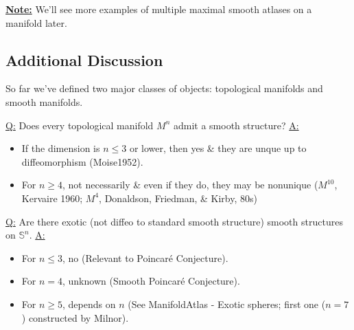 \documentclass{article}
\begin{document}
\vskip 0.5cm  
\underline{\textbf{Note:}} We'll see more examples of multiple maximal smooth atlases on a manifold later.

\vskip 1cm  
\subsection*{Additional Discussion}

\vskip 0.5cm  
So far we've defined two major classes of objects: topological manifolds and smooth manifolds.

\vskip 0.5cm  
\begin{dottedbox}
  \underline{Q:} Does every topological manifold $M^n$ admit a smooth structure?
  \vskip 0.5cm  
  \underline{A:} 
  \begin{itemize}
    \item If the dimension is $n \leq 3$ or lower, then yes \& they are unque up to diffeomorphism (Moise1952).
    \item For $n \geq 4$, not necessarily \& even if they do, they may be nonunique ($M^{10}$, Kervaire 1960; $M^4$, Donaldson, Friedman, \& Kirby, 80s)
  \end{itemize} 
\end{dottedbox}

\vskip 0.5cm  
\begin{dottedbox}
  \underline{Q:} Are there exotic (not diffeo to standard smooth structure) smooth structures on $\mathbb{S}^n$.
  \vskip 0.5cm  
  \underline{A:} 
  \begin{itemize}
    \item For $n \leq 3$, no (Relevant to Poincaré Conjecture).
    \item For $n = 4$, unknown (Smooth Poincaré Conjecture).
    \item For $n \geq 5$, depends on $n$ (See ManifoldAtlas - Exotic spheres; first one ($n = 7$) constructed by Milnor).
  \end{itemize} 
\end{dottedbox}

\vskip 1cm  
\end{document}
